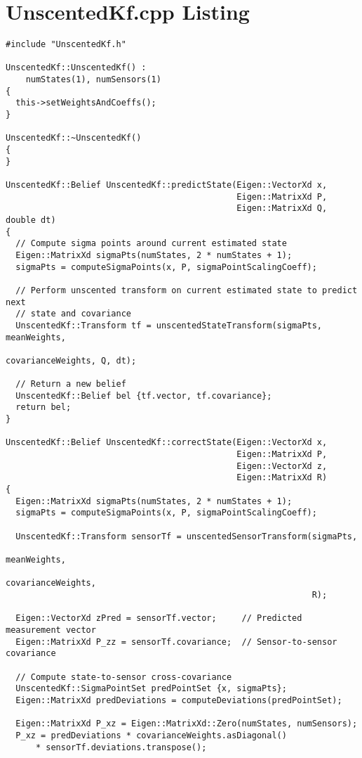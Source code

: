 \chapter{UnscentedKf.cpp Listing}

\begin{verbatim}
#include "UnscentedKf.h"

UnscentedKf::UnscentedKf() :
    numStates(1), numSensors(1)
{
  this->setWeightsAndCoeffs();
}

UnscentedKf::~UnscentedKf()
{
}

UnscentedKf::Belief UnscentedKf::predictState(Eigen::VectorXd x,
                                              Eigen::MatrixXd P,
                                              Eigen::MatrixXd Q, double dt)
{
  // Compute sigma points around current estimated state
  Eigen::MatrixXd sigmaPts(numStates, 2 * numStates + 1);
  sigmaPts = computeSigmaPoints(x, P, sigmaPointScalingCoeff);

  // Perform unscented transform on current estimated state to predict next
  // state and covariance
  UnscentedKf::Transform tf = unscentedStateTransform(sigmaPts, meanWeights,
                                                      covarianceWeights, Q, dt);

  // Return a new belief
  UnscentedKf::Belief bel {tf.vector, tf.covariance};
  return bel;
}

UnscentedKf::Belief UnscentedKf::correctState(Eigen::VectorXd x,
                                              Eigen::MatrixXd P,
                                              Eigen::VectorXd z,
                                              Eigen::MatrixXd R)
{
  Eigen::MatrixXd sigmaPts(numStates, 2 * numStates + 1);
  sigmaPts = computeSigmaPoints(x, P, sigmaPointScalingCoeff);

  UnscentedKf::Transform sensorTf = unscentedSensorTransform(sigmaPts,
                                                             meanWeights,
                                                             covarianceWeights,
                                                             R);

  Eigen::VectorXd zPred = sensorTf.vector;     // Predicted measurement vector
  Eigen::MatrixXd P_zz = sensorTf.covariance;  // Sensor-to-sensor covariance

  // Compute state-to-sensor cross-covariance
  UnscentedKf::SigmaPointSet predPointSet {x, sigmaPts};
  Eigen::MatrixXd predDeviations = computeDeviations(predPointSet);

  Eigen::MatrixXd P_xz = Eigen::MatrixXd::Zero(numStates, numSensors);
  P_xz = predDeviations * covarianceWeights.asDiagonal()
      * sensorTf.deviations.transpose();


\end{verbatim}
